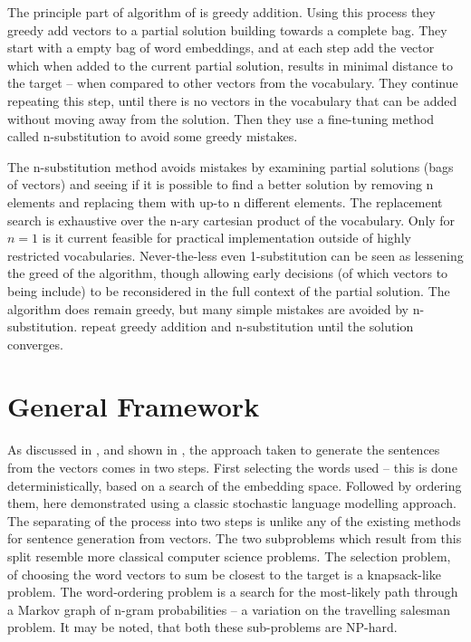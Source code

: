 \documentclass[11pt]{article}
\theoremstyle{plain}
\theoremstyle{definition}
\begin{document}
The principle part of algorithm of \textcite{White2015BOWgen} is greedy addition. Using this process they greedy add vectors to a partial solution building towards a complete bag. They start with a empty bag of word embeddings, and at each step add the vector which when added to the current partial solution, results in minimal distance to the target -- when compared to other vectors from the vocabulary. They continue repeating this step, until there is no vectors in the vocabulary that can be added without moving away from the solution. Then they use a fine-tuning method called n-substitution to avoid some greedy mistakes.

The n-substitution method avoids mistakes by examining partial solutions (bags of vectors) and seeing if it is possible to find a better solution by removing n elements and replacing them with up-to n different elements. The replacement search is exhaustive over the n-ary cartesian product of the vocabulary. Only for $n=1$ is it current feasible for practical implementation outside of highly restricted vocabularies. Never-the-less even 1-substitution can be seen as lessening the greed of the algorithm, though allowing early decisions (of which vectors to being include) to be reconsidered in the full context of the partial solution. The algorithm does remain greedy, but many simple mistakes are avoided by n-substitution. \textcite{White2015BOWgen} repeat greedy addition and n-substitution until the solution converges.




\section{General Framework}\label{framework}
As discussed in , and shown in , the approach taken to generate the sentences from the vectors comes in two steps. First selecting the words used -- this is done deterministically, based on a search of the embedding space. Followed by ordering them, here demonstrated using a classic stochastic language modelling approach. The separating of the process into two steps is unlike any of the existing methods for sentence generation from vectors. The two subproblems which result from this split resemble more classical computer science problems. The selection problem, of choosing the word vectors to sum be closest to the target is a knapsack-like problem. The word-ordering problem is a search for the most-likely path through a Markov graph of n-gram probabilities -- a variation on the travelling salesman problem. It may be noted, that both these sub-problems are NP-hard.
\end{document}
